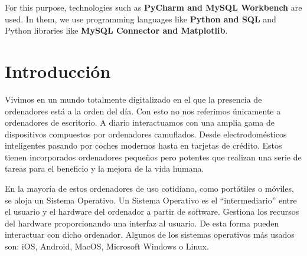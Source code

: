 \documentclass[a4paper, 12pt]{book}
\begin{document}
For this purpose, technologies such as \textbf{PyCharm and MySQL Workbench} are used.
In them, we use programming languages like \textbf{Python and SQL} and Python libraries like \textbf{MySQL Connector and Matplotlib}.




\tableofcontents 
\cleardoublepage
\listoffigures %



\cleardoublepage
\chapter{Introducción}
\label{sec:intro} %

Vivimos en un mundo totalmente digitalizado en el que la presencia de ordenadores está a la orden del día. Con esto no nos referimos únicamente a ordenadores de escritorio. A diario interactuamos con una amplia gama de dispositivos compuestos por ordenadores camuflados. Desde electrodomésticos inteligentes pasando por coches modernos hasta en tarjetas de crédito. Estos tienen incorporados ordenadores pequeños pero potentes que realizan una serie de tareas para el beneficio y la mejora de la vida humana.

En la mayoría de estos ordenadores de uso cotidiano, como portátiles o móviles, se aloja un Sistema Operativo. Un Sistema Operativo es el “intermediario” entre el usuario y el hardware del ordenador a partir de software. Gestiona los recursos del hardware proporcionando una interfaz al usuario. De esta forma pueden interactuar con dicho ordenador. 
Algunos de los sistemas operativos más usados son: iOS, Android, MacOS, Microsoft Windows o Linux. 
\end{document}
